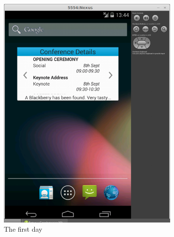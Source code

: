 \documentclass[11pt, a4paper]{article}
\begin{document}
\begin{figure}[h]
\centering
\begin{subfigure}[b]{0.3\textwidth}
\includegraphics[width=\textwidth]{img/running-day-1.png}
\caption{The first day}
\end{subfigure}
\begin{subfigure}[b]{0.3\textwidth}

\end{subfigure}
\end{figure}
\end{document}
